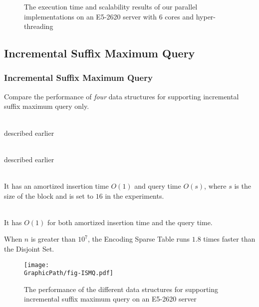 \begin{frame}
	\begin{center}
		\scalebox{0.8} { \begin{minipage}{1.3\textwidth}
			\begin{figure}
			  \centering
			  \caption{The execution time and scalability results of our parallel
			    implementations on an E5-2620 server with 6 cores and
			    hyper-threading}
			\end{figure}
			\end{minipage}
		}
	\end{center}
\end{frame}

\subsection{Incremental Suffix Maximum Query}
\begin{frame}
    \frametitle{Incremental Suffix Maximum Query}
    Compare the performance of {\em four} data structures for supporting
	incremental suffix maximum query only.

    \begin{description}
    	\setlength\itemsep{1em}
    	\item[{\sc Disjoint Set}] \hfill \\
    		described earlier
    	\item[{\sc Sparse Table}] \hfill \\
    		described earlier
    	\item[{\sc Encoding Sparse Table}] \hfill \\
    		It has an amortized insertion time $O(1)$ and query time
			$O(s)$, where $s$ is the size of the block and is set to
			$16$ in the experiments.
    	\item[{\sc LCA Blocked Sparse Table}]  \hfill \\
    		It has $O(1)$ for both amortized insertion time and the
			query time.
    \end{description}
\end{frame}

\begin{frame}
	When $n$ is greater than $10^7$, the {\sc Encoding Sparse Table}
	runs $1.8$ times faster than the {\sc Disjoint Set}.
	\begin{center}
	\scalebox{0.7} { \begin{minipage}{1.3\textwidth}
			\begin{figure}
			  \centering
			  \texttt{[image: \\GraphicPath/fig-ISMQ.pdf]}
			  \caption{The performance of the different data structures for
			    supporting incremental suffix maximum query on an E5-2620 server}
			  \label{fig:fig-ISMQcmp}
			\end{figure}
			\end{minipage}
		}
	\end{center}
\end{frame}

